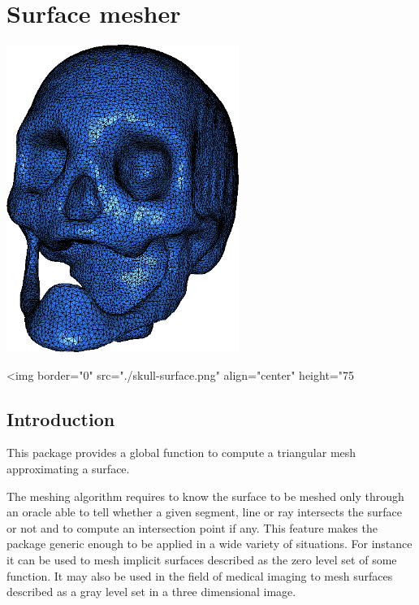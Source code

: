 \chapter{Surface mesher}
\label{chapter_SurfaceMesher}

\minitoc

\begin{ccTexOnly}
\begin{center}
\includegraphics[height=10cm]{Surface_mesher/skull-surface}
\end{center}
\end{ccTexOnly}
\begin{ccHtmlOnly}
<img border="0" src="./skull-surface.png" align="center" height="75%
\end{ccHtmlOnly}

\section{Introduction}
\label{SurfaceMesher_section_intro}

This package provides a global function
to compute a triangular mesh approximating a surface.

The meshing algorithm requires to know the surface to be meshed
only  through an oracle able to  tell whether a
given segment, line or ray intersects the surface or not
and to compute an intersection point if any.
This feature makes the package generic enough to be
applied in a wide variety of situations. For instance it can be
used to mesh implicit surfaces described as the zero level set
of some function. It may also be used in the field of medical imaging
to mesh surfaces described as a gray
level set in a three dimensional image.


